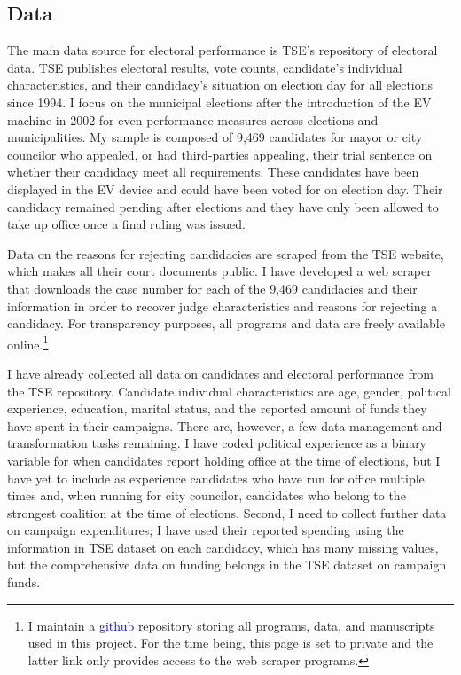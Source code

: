 \documentclass[11pt]{article}
\begin{document}
\subsection{Data} \label{subsec:data_paper1}

The main data source for electoral performance is TSE's repository of electoral data. TSE publishes electoral results, vote counts, candidate's individual characteristics, and their candidacy's situation on election day for all elections since 1994. I focus on the municipal elections after the introduction of the EV machine in 2002 for even performance measures across elections and municipalities. My sample is composed of 9,469 candidates for mayor or city councilor who appealed, or had third-parties appealing, their trial sentence on whether their candidacy meet all requirements. These candidates have been displayed in the EV device and could have been voted for on election day. Their candidacy remained pending after elections and they have only been allowed to take up office once a final ruling was issued.

Data on the reasons for rejecting candidacies are scraped from the TSE website, which makes all their court documents public. I have developed a web scraper that downloads the case number for each of the 9,469 candidacies and their information in order to recover judge characteristics and reasons for rejecting a candidacy. For transparency purposes, all programs and data are freely available online.\footnote{I maintain a \href{https://www.github.com/aassumpcao/tse-scraper}{\textcolor{blue}{github}} repository storing all programs, data, and manuscripts used in this project. For the time being, this page is set to private and the latter link only provides access to the web scraper programs.}

I have already collected all data on candidates and electoral performance from the TSE repository. Candidate individual characteristics are age, gender, political experience, education, marital status, and the reported amount of funds they have spent in their campaigns. There are, however, a few data management and transformation tasks remaining. I have coded political experience as a binary variable for when candidates report holding office at the time of elections, but I have yet to include as experience candidates who have run for office multiple times and, when running for city councilor, candidates who belong to the strongest coalition at the time of elections. Second, I need to collect further data on campaign expenditures; I have used their reported spending using the information in TSE dataset on each candidacy, which has many missing values, but the comprehensive data on funding belongs in the TSE dataset on campaign funds.
\end{document}
